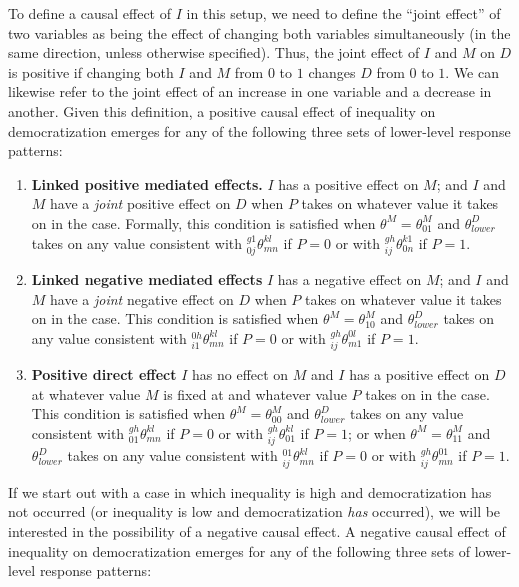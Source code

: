 \documentclass[12pt,]{book}
\begin{document}
To define a causal effect of \(I\) in this setup, we need to define the ``joint effect'' of two variables as being the effect of changing both variables simultaneously (in the same direction, unless otherwise specified). Thus, the joint effect of \(I\) and \(M\) on \(D\) is positive if changing both \(I\) and \(M\) from \(0\) to \(1\) changes \(D\) from \(0\) to \(1\). We can likewise refer to the joint effect of an increase in one variable and a decrease in another. Given this definition, a positive causal effect of inequality on democratization emerges for any of the following three sets of lower-level response patterns:

\begin{enumerate}
\def\labelenumi{\arabic{enumi}.}
\item
  \textbf{Linked positive mediated effects.} \(I\) has a positive effect on \(M\); and \(I\) and \(M\) have a \emph{joint} positive effect on \(D\) when \(P\) takes on whatever value it takes on in the case. Formally, this condition is satisfied when \(\theta^M=\theta^M_{01}\) and \(\theta^D_{lower}\) takes on any value consistent with \(_{0j}^{g1}\theta_{mn}^{kl}\) if \(P=0\) or with \(_{ij}^{gh}\theta_{0n}^{k1}\) if \(P=1\).
\item
  \textbf{Linked negative mediated effects} \(I\) has a negative effect on \(M\); and \(I\) and \(M\) have a \emph{joint} negative effect on \(D\) when \(P\) takes on whatever value it takes on in the case. This condition is satisfied when \(\theta^M=\theta^M_{10}\) and \(\theta^D_{lower}\) takes on any value consistent with \(_{i1}^{0h}\theta_{mn}^{kl}\) if \(P=0\) or with \(_{ij}^{gh}\theta_{m1}^{0l}\) if \(P=1\).
\item
  \textbf{Positive direct effect} \(I\) has no effect on \(M\) and \(I\) has a positive effect on \(D\) at whatever value \(M\) is fixed at and whatever value \(P\) takes on in the case. This condition is satisfied when \(\theta^M=\theta^M_{00}\) and \(\theta^D_{lower}\) takes on any value consistent with \(_{01}^{gh}\theta_{mn}^{kl}\) if \(P=0\) or with \(_{ij}^{gh}\theta_{01}^{kl}\) if \(P=1\); or when \(\theta^M=\theta^M_{11}\) and \(\theta^D_{lower}\) takes on any value consistent with \(_{ij}^{01}\theta_{mn}^{kl}\) if \(P=0\) or with \(_{ij}^{gh}\theta_{mn}^{01}\) if \(P=1\).
\end{enumerate}

If we start out with a case in which inequality is high and democratization has not occurred (or inequality is low and democratization \emph{has} occurred), we will be interested in the possibility of a negative causal effect. A negative causal effect of inequality on democratization emerges for any of the following three sets of lower-level response patterns:
\end{document}
